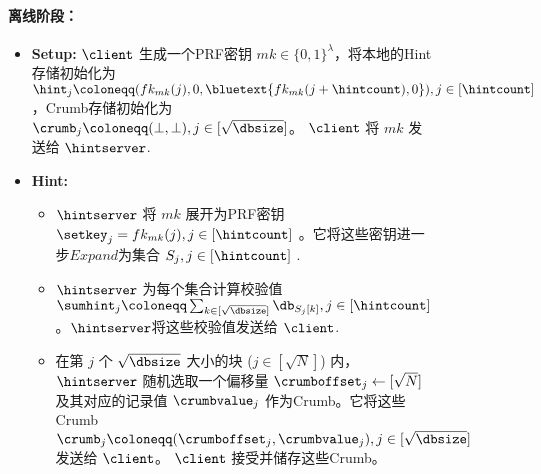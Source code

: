\begin{figure*}
\begin{mdframed}
        \paragraph{离线阶段：}
        \begin{itemize}
            \item \textbf{Setup:} $\client$ 生成一个PRF密钥 $mk\in\{0,1\}^\lambda$，将本地的Hint存储初始化为 $\hint_j\coloneqq(fk_{mk}(j),0,\bluetext{fk_{mk}(j+\hintcount),0}), j\in [\hintcount]$，Crumb存储初始化为 $\crumb_j\coloneqq (\bot,\bot), j\in [\sqrt{\dbsize}]$。 $\client$ 将 $mk$ 发送给 $\hintserver$.
            \item \textbf{Hint:}
                  \begin{itemize}
                      \item $\hintserver$ 将 $mk$ 展开为PRF密钥 $\setkey_j=fk_{mk}(j), j\in[\hintcount]$ 。它将这些密钥进一步$Expand$为集合 $S_j, j\in[\hintcount]$ .
                      \item $\hintserver$ 为每个集合计算校验值 $\sumhint_j\coloneqq \sum_{k\in [\sqrt{\dbsize}]}\db_{S_{j}[k]}, j\in[\hintcount]$ 。$\hintserver$将这些校验值发送给 $\client$.
                      \item 在第 $j$ 个 $\sqrt{\dbsize}$ 大小的块 ($j\in[\sqrt{N}]$) 内， $\hintserver$ 随机选取一个偏移量 $\crumboffset_j\leftarrow [\sqrt{N}]$ 及其对应的记录值 $\crumbvalue_j$ 作为Crumb。它将这些Crumb $\crumb_j \coloneqq  (\crumboffset_j, \crumbvalue_j), j\in [\sqrt{\dbsize}]$ 发送给 $\client$。 $\client$ 接受并储存这些Crumb。
                  \end{itemize}
        \end{itemize}

\end{mdframed}
\end{figure*}

